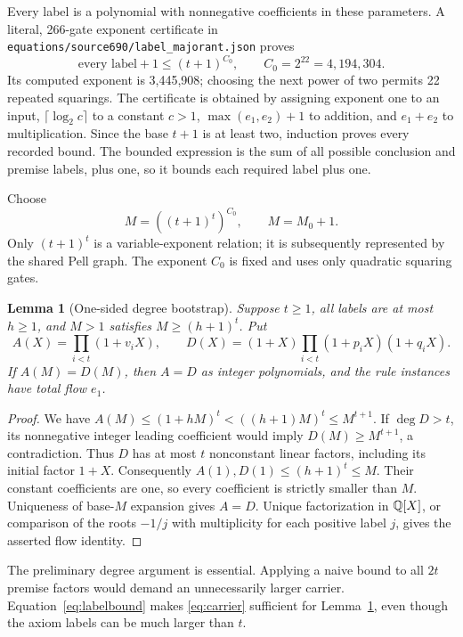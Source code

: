 \documentclass[10pt,letterpaper]{article}
\newtheorem{lemma}[theorem]{Lemma}
\theoremstyle{definition}\newtheorem{definition}[theorem]{Definition}
\theoremstyle{remark}\newtheorem{remark}[theorem]{Remark}
\newcommand{\file}[1]{\texttt{\nolinkurl{#1}}}
\begin{document}
Every label is a polynomial with nonnegative coefficients in these
parameters. A literal, 266-gate exponent certificate in
\file{equations/source690/label_majorant.json} proves
\begin{equation}\label{eq:labelbound}
 \text{every label}+1\le (t+1)^{C_0},\qquad C_0=2^{22}=4,194,304.
\end{equation}
Its computed exponent is 3,445,908; choosing the next power of two
permits 22 repeated squarings. The certificate is obtained by assigning
exponent one to an input, $\lceil\log_2c\rceil$ to a constant $c>1$,
$\max(e_1,e_2)+1$ to addition, and $e_1+e_2$ to multiplication. Since
the base $t+1$ is at least two, induction proves every recorded bound.
The bounded expression is the sum of all possible conclusion and premise
labels, plus one, so it bounds each required label plus one.

Choose
\begin{equation}\label{eq:carrier}
 M=((t+1)^t)^{C_0},\qquad M=M_0+1.
\end{equation}
Only $(t+1)^t$ is a variable-exponent relation; it is subsequently
represented by the shared Pell graph. The exponent $C_0$ is fixed and
uses only quadratic squaring gates.

\begin{lemma}[One-sided degree bootstrap]\label{lem:carrier}
Suppose $t\ge1$, all labels are at most $h\ge1$, and $M>1$ satisfies
$M\ge(h+1)^t$. Put
\[
 A(X)=\prod_{i<t}(1+v_iX),\qquad
 D(X)=(1+X)\prod_{i<t}(1+p_iX)(1+q_iX).
\]
If $A(M)=D(M)$, then $A=D$ as integer polynomials, and the rule instances
have total flow $e_1$.
\end{lemma}
\begin{proof}
We have
$A(M)\le(1+hM)^t<((h+1)M)^t\le M^{t+1}$.
If $\deg D>t$, its nonnegative integer leading coefficient would imply
$D(M)\ge M^{t+1}$, a contradiction. Thus $D$ has at most $t$ nonconstant
linear factors, including its initial factor $1+X$. Consequently
$A(1),D(1)\le(h+1)^t\le M$. Their constant coefficients are one, so
every coefficient is strictly smaller than $M$. Uniqueness of base-$M$
expansion gives $A=D$. Unique factorization in $\mathbb Q[X]$, or comparison
of the roots $-1/j$ with multiplicity for each positive label $j$,
gives the asserted flow identity.
\end{proof}

The preliminary degree argument is essential. Applying a naive bound to
all $2t$ premise factors would demand an unnecessarily larger carrier.
Equation~\eqref{eq:labelbound} makes \eqref{eq:carrier} sufficient for
Lemma~\ref{lem:carrier}, even though the axiom labels can be much larger
than $t$.
\end{document}
